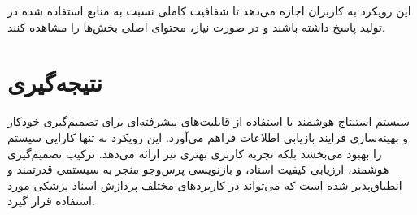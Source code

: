 این رویکرد به کاربران اجازه می‌دهد تا شفافیت کاملی نسبت به منابع استفاده شده در تولید پاسخ داشته باشند و در صورت نیاز، محتوای اصلی بخش‌ها را مشاهده کنند.

\section{نتیجه‌گیری}
سیستم استنتاج هوشمند  با استفاده از  قابلیت‌های پیشرفته‌ای برای تصمیم‌گیری خودکار و بهینه‌سازی فرایند بازیابی اطلاعات فراهم می‌آورد. این رویکرد نه تنها کارایی سیستم را بهبود می‌بخشد بلکه تجربه کاربری بهتری نیز ارائه می‌دهد. ترکیب تصمیم‌گیری هوشمند، ارزیابی کیفیت اسناد، و بازنویسی پرس‌وجو منجر به سیستمی قدرتمند و انطباق‌پذیر شده است که می‌تواند در کاربردهای مختلف پردازش اسناد پزشکی مورد استفاده قرار گیرد.
